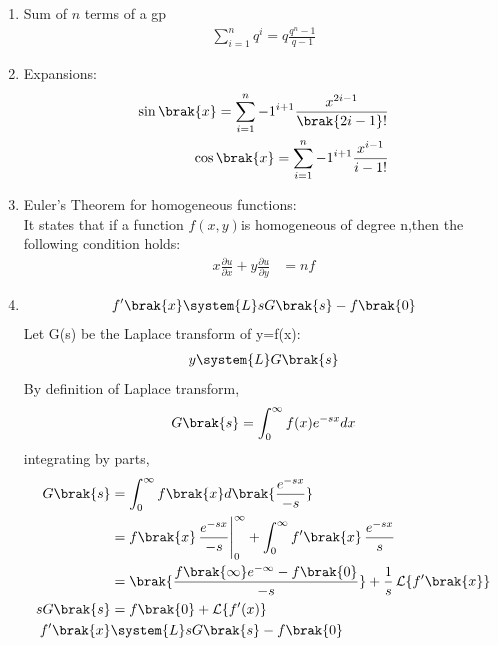 \begin{enumerate}[label=\thesubsection.\arabic*,ref=\thesubsection.\theenumi]
\item
Sum of $n$ terms of a gp\\
\begin{align}
	\sum_{i=1}^{n}q^i=q\frac{q^n-1}{q-1}\label{eq:sumofgp}
\end{align}
\item
Expansions:\label{eq:expansions}\\
\begin{align}
	\sin\brak{x}=\sum_{i=1}^{n}-1^{i+1}\frac{x^{2i-1}}{\brak{2i-1}!}\\
	\cos\brak{x}=\sum_{i=1}^{n}-1^{i+1}\frac{x^{i-1}}{{i-1}!}
\end{align}
\item
Euler's Theorem for homogeneous functions:\\
It states that if a function $f(x,y)$is homogeneous of degree n,then the following condition holds:\\
\begin{align}
    x\frac{\partial u}{\partial x}+y\frac{\partial u}{\partial y}&=nf\label{eq:eulerhomo}
\end{align}
\item
\begin{equation}
	f'\brak{x}\system{L}sG\brak{s}-f\brak{0}\label{eq:laplace1d}
\end{equation}
\solution
Let G(s) be the Laplace transform of y=f(x):\\
\begin{align}
    y\system{L}G\brak{s}
\end{align}
By definition of Laplace transform,\\
\begin{align}
	G\brak{s}=\int_{0}^{\infty}f(x)e^{-sx}dx
\end{align}
integrating by parts,
\begin{align}
	G\brak{s}&=\int_0^{\infty}f\brak{x}d\brak{\frac{e^{-sx}}{-s}}\\
			 &=f\brak{x}\,\frac{e^{-sx}}{-s}\Bigg|_0^{\infty}+\int_0^{\infty}f'\brak{x}\,\frac{e^{-sx}}{s}\\
			 &=\brak{\frac{f\brak{\infty}e^{-\infty}-f\brak{0}}{-s}}+\frac{1}{s}\,\mathcal{L}\{f'\brak{x}\}\\
			 sG\brak{s}&=f\brak{0}+\mathcal{L}\{f'(x)\}\\
			 f'\brak{x}&\system{L}sG\brak{s}-f\brak{0}			 		
\end{align}

\end{enumerate}
